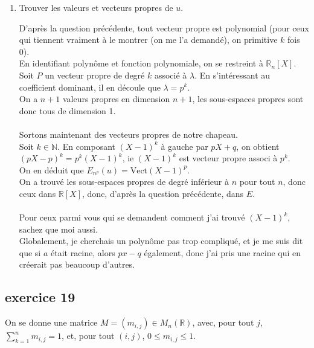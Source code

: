 \documentclass[a4paper,12pt]{article}
\begin{document}
\begin{enumerate}
		\item Trouver les valeurs et vecteurs propres de $u$.
		\begin{correctionbox}
			D'après la question précédente, tout vecteur propre est polynomial (pour ceux qui tiennent vraiment à le montrer (on me l'a demandé), on primitive $k$ fois 0). \\ En identifiant polynôme et fonction polynomiale, on se restreint à $\mathbb R_n [X]$. \\
			Soit $P$ un vecteur propre de degré $k$ associé à $\lambda$. En s'intéressant au coefficient dominant, il en découle que $\lambda={p^k}$. \\
			On a $n+1$ valeurs propres en dimension $n+1$, les sous-espaces propres sont donc tous de dimension 1.\\ \\
			Sortons maintenant des vecteurs propres de notre chapeau. \\
			Soit $k \in \mathbb N$. En composant $ (X-1)^k $ à gauche par $pX+q$, on obtient $ (pX-p)^k = p^k (X-1)^k $, ie $(X-1)^k$ est vecteur propre associ à $p^k$.\\
			On en déduit que $E_{{n^p}}(u) = \mathrm{Vect} (X-1)^p $. \\
			On a trouvé les sous-espaces propres de degré inférieur à $n$ pour tout $n$, donc ceux dans $ \mathbb R [X] $, donc, d'après la question précédente, dans $E$. \\
			\\
			Pour ceux parmi vous qui se demandent comment j'ai trouvé $(X-1)^k$, sachez que moi aussi. \\
			Globalement, je cherchais un polynôme pas trop compliqué, et je me suis dit que si $a$ était racine, alors $px-q$ également, donc j'ai pris une racine qui en créerait pas beaucoup d'autres.
		\end{correctionbox}
	\end{enumerate}
	
	
	\subsection*{exercice 19}
	On se donne une matrice $ M = (m_{i,j}) \in M_n(\mathbb{R}) $, avec, pour tout $ j $, $ \sum_{k=1}^{n} m_{i, j} = 1 $, et, pour tout $ (i, j) $, $ 0 \leqslant m_{i, j} \leqslant 1 $. \\
	
\end{document}
